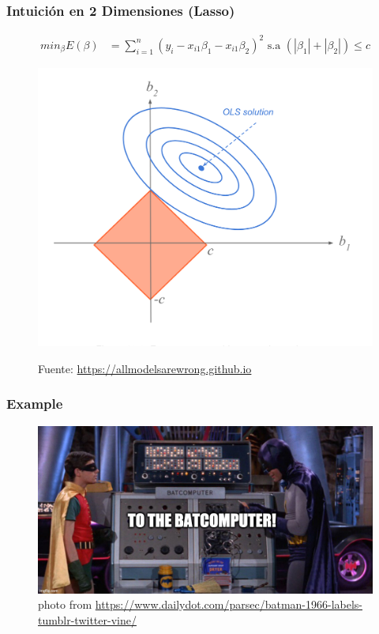 \documentclass[
  shownotes,
  xcolor={svgnames},
  hyperref={colorlinks,citecolor=DarkBlue,linkcolor=andesred,urlcolor=DarkBlue}
  , aspectratio=169]{beamer}
\begin{document}
\begin{frame}[fragile]
\frametitle{Intuición en 2 Dimensiones (Lasso)}
\footnotesize
\begin{align}
     min_{\beta} E(\beta) &= \sum_{i=1}^n (y_i - x_{i1}\beta_1 - x_{i1}\beta_2)^2  \text{ s.a }   \left( |\beta_1| + |\beta_2| \right) \leq c 
  \end{align}

\begin{figure}[H] \centering
            \captionsetup{justification=centering}
              \includegraphics[scale=0.4]{figures/lasso_ridge2}
 
\tiny
Fuente: \url{https://allmodelsarewrong.github.io}
\end{figure}

 \end{frame}


\begin{frame}[fragile]
\frametitle{Example}
\begin{figure}[H] \centering
  \centering
  \includegraphics[scale=0.35]{figures/baticomputer_meme.jpg}
  \\
  \tiny photo from \url{https://www.dailydot.com/parsec/batman-1966-labels-tumblr-twitter-vine/}
\end{figure}

 \end{frame}
\end{document}
